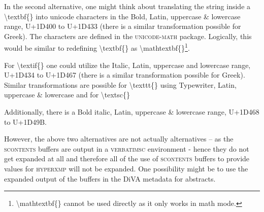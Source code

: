 In the second alternative, one might think about translating the string inside a \textbackslash textbf\{\} into unicode characters in the Bold, Latin, uppercase \& lowercase range, \ie U+1D400 to U+1D433 (there is a similar transformation possible for Greek). The characters are defined in the \textsc{unicode-math} package. Logically, this would be similar to redefining \textbackslash textbf\{\} as \textbackslash mathtextbf\{\}\footnote{\textbackslash mathtextbf\{\} cannot be used directly as it only works in math mode.}.  

For \textbackslash textif\{\} one could utilize the Italic, Latin, uppercase  and lowercase range, \ie U+1D434 to U+1D467 (there is a similar transformation possible for Greek). Similar transformations are possible for \textbackslash texttt\{\}
using Typewriter, Latin, uppercase \& lowercase and for \textbackslash textsc\{\}

Additionally, there is a  Bold italic, Latin, uppercase \& lowercase range, \ie U+1D468 to U+1D49B.

However, the above two alternatives are not actually alternatives -- as the \textsc{scontents} buffers are output in a \textsc{verbatimsc} environment - hence they do not get expanded at all and therefore all of the use of \textsc{scontents} buffers to provide values for \textsc{hyperxmp} will not be expanded. One possibility might be to use the expanded output of the buffers in the DiVA metadata for abstracts.

%
